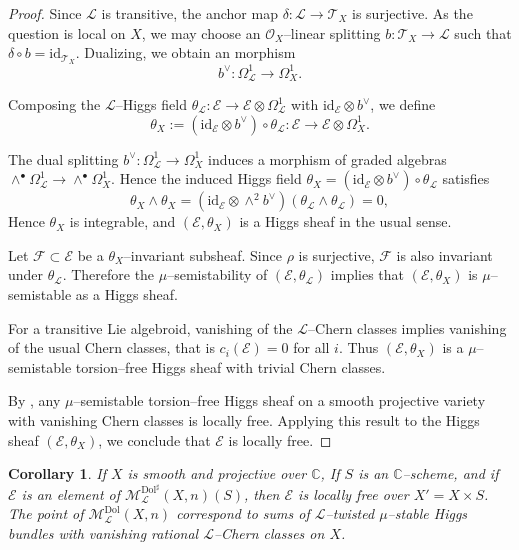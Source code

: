 \documentclass[12pt,reqno]{amsart}
\numberwithin{equation}{subsection}
\newtheorem{corollary}[equation]{Corollary}
\theoremstyle{definition}
\theoremstyle{theorem}
\begin{document}
\begin{proof}
	Since $\mathcal L$ is transitive, the anchor map
	$\delta : \mathcal L \to \mathcal{T}_X$ is surjective. As the question is local on
	$X$, we may choose an $\mathcal O_X$--linear splitting
	$b : \mathcal{T}_X \to \mathcal L$ such that $\delta \circ b = \mathrm{id}_{\mathcal{T}_X}$.
	Dualizing, we obtain an morphism
	\[
	b^\vee : \Omega^1_{\mathcal L} \longrightarrow \Omega^1_X .
	\]
	
	Composing the $\mathcal L$--Higgs field
	$\theta_{\mathcal L} : \mathcal{E} \to \mathcal{E} \otimes \Omega^1_{\mathcal L}$
	with $\mathrm{id}_\mathcal{E} \otimes b^\vee$, we define
	\[
	\theta_X := (\mathrm{id}_\mathcal{E} \otimes b^\vee)\circ \theta_{\mathcal L}
	: \mathcal{E} \longrightarrow \mathcal{E} \otimes \Omega^1_X .
	\]
	
	The dual splitting $b^\vee:\Omega^1_{\mathcal L}\to\Omega^1_X$ induces a
	morphism of graded algebras
	$\wedge^\bullet\Omega^1_{\mathcal L}\to\wedge^\bullet\Omega^1_X$.
	Hence the induced Higgs field
	$\theta_X=(\mathrm{id}_\mathcal{E}\otimes b^\vee)\circ\theta_{\mathcal L}$
	satisfies
	\[
	\theta_X\wedge\theta_X
	=(\mathrm{id}_\mathcal{E}\otimes\wedge^2 b^\vee)
	(\theta_{\mathcal L}\wedge\theta_{\mathcal L})=0,
	\]
	Hence $\theta_X$ is integrable, and $(\mathcal{E},\theta_X)$ is a Higgs sheaf in the usual sense.
	
	
	Let $\mathcal{F} \subset \mathcal{E}$ be a $\theta_X$--invariant subsheaf.
	Since $\rho$ is surjective, $\mathcal{F}$ is also invariant under
	$\theta_{\mathcal L}$. Therefore the $\mu$--semistability of
	$(\mathcal{E},\theta_{\mathcal L})$ implies that $(\mathcal{E},\theta_X)$ is
	$\mu$--semistable as a Higgs sheaf.
	
	For a transitive Lie algebroid, vanishing of the $\mathcal L$--Chern
	classes implies vanishing of the usual Chern classes, that is
	$c_i(\mathcal{E})=0$ for all $i$.
	Thus $(\mathcal{E},\theta_X)$ is a $\mu$--semistable torsion--free Higgs sheaf
	with trivial Chern classes.
	
	By \cite[\S\,6, Proposition~6.6]{CT.Simpson-1995}, any $\mu$--semistable
	torsion--free Higgs sheaf on a smooth projective variety with vanishing
	Chern classes is locally free. Applying this result to the Higgs sheaf
	$(\mathcal{E},\theta_X)$, we conclude that $\mathcal{E}$ is locally free.
	
	
\end{proof}

\begin{corollary}
If $X$ is smooth and projective over $\mathbb{C}$, If $S$ is an $\mathbb{C}$--scheme, and if $\mathcal{E}$ is an element of $\mathcal{M}^{\text{Dol}^{\sharp}}_{\mathcal{L}}(X,n)(S)$, then $\mathcal{E}$ is locally free over $X'=X\times S$. The point of $\mathcal{M}^{\text{Dol}}_{\mathcal{L}}(X,n)$ correspond to sums of $\mathcal{L}$--twisted $\mu$--stable Higgs bundles with vanishing rational $\mathcal{L}$--Chern classes on $X$.
\end{corollary}
\end{document}
